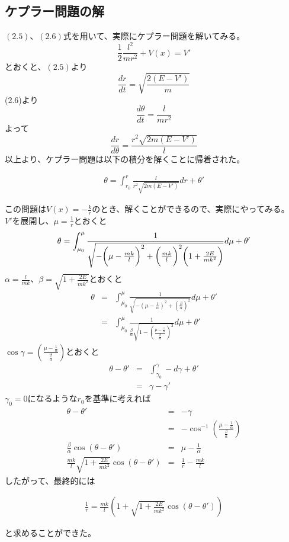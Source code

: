 \documentclass[dvipdfmx]{report} %
\begin{document}
\subsection{
ケプラー問題の解
}
$(2.5)$、$(2.6)$式を用いて、実際にケプラー問題を解いてみる。\\
$$ \frac{1}{2} \frac{l^2}{mr^2} + V(x) = V' $$
とおくと、$(2.5)$より
$$ \frac{dr}{dt} = \sqrt{ \frac{2(E-V')}{m} } $$
(2.6)より
$$ \frac{d\theta}{dt} = \frac{l}{mr^2}$$
よって
$$
\frac{dr}{d\theta} = \frac{ r^2 \sqrt{2m(E-V')} }{l}
$$
以上より、ケプラー問題は以下の積分を解くことに帰着された。
\begin{tcolorbox}
\begin{eqnarray*}
	\theta = \int_{r_0}^{r} \frac{l}{r^2 \sqrt{2m(E-V')} } dr + \theta'
\end{eqnarray*}
\end{tcolorbox}
\noindent
この問題は$V(x) = - \frac{k}{r}$のとき、解くことができるので、実際にやってみる。\\
$V'$を展開し、$\mu = \frac{1}{r}$とおくと
$$ \theta = \int_{\mu_0}^{\mu} \frac{1}{ \sqrt{ -\biggl{(} \mu - \frac{mk}{l} \biggr{)}^2 + \biggl{(} \frac{mk}{l} \biggr{)}^2 \biggl{(} 1 + \frac{2E}{mk^2} \biggr{)} } } d\mu + \theta'$$
$\alpha = \frac{l}{mk}$、$\beta = \sqrt{ 1 + \frac{2E}{mk^2} }$とおくと
\begin{eqnarray*}
    \theta &=& \int_{\mu_0}^{\mu}
    \frac{1}{ \sqrt{ -\left( \mu - \frac{1}{\alpha} \right)^2 + \left( \frac{\beta}{\alpha} \right)^2 } }
    d\mu + \theta' \\
    &=& \int_{\mu_0}^{\mu}
    \frac{1}{ \frac{\beta}{\alpha} \sqrt{ 1 - \left( \frac{ \mu - \frac{1}{\alpha} }{ \frac{\beta}{\alpha} } \right)^2 } }
    d\mu + \theta'
\end{eqnarray*}
$\cos{\gamma} = \left( \frac{ \mu - \frac{1}{\alpha} }{ \frac{\beta}{\alpha} } \right) $とおくと
\begin{eqnarray*}
    \theta -  \theta' &=& \int_{\gamma_0}^{\gamma} - d\gamma + \theta' \\
    &=& \gamma - \gamma '
\end{eqnarray*}
$\gamma_0 = 0$になるような$r_0$を基準に考えれば
\begin{eqnarray*}
    \theta - \theta' &=& - \gamma \\
    &=& - \cos^{-1} \left( \frac{ \mu - \frac{1}{\alpha} }{ \frac{\beta}{\alpha} } \right) \\
    \frac{\beta}{\alpha} \cos{(\theta - \theta')} &=& \mu - \frac{1}{\alpha} \\
    \frac{mk}{l} \sqrt{ 1 + \frac{2E}{mk^2} } \cos{(\theta - \theta')} &=& \frac{1}{r} - \frac{mk}{l}
\end{eqnarray*}
したがって、最終的には
\begin{tcolorbox}
\begin{eqnarray*}
	\frac{1}{r} = \frac{mk}{l} \left( 1 + \sqrt{ 1 + \frac{2E}{mk^2} } \cos{( \theta - \theta' )} \right)
\end{eqnarray*}
\end{tcolorbox}
\noindent
と求めることができた。
\end{document}
